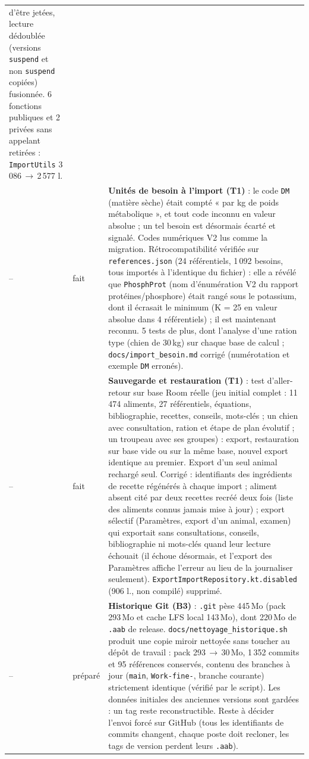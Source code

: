 \documentclass[11pt,a4paper]{article}
\newcommand{\code}[1]{\texttt{#1}}
\begin{document}
\begin{longtable}{p{0.5cm}p{3.2cm}p{11cm}}
           d'être jetées, lecture dédoublée (versions \code{suspend} et non \code{suspend} copiées)
           fusionnée. 6 fonctions publiques et 2 privées sans appelant retirées :
           \code{ImportUtils} 3\,086\,$\to$\,2\,577 l. \\
-- & fait & \textbf{Unités de besoin à l'import (T1)} : le code \code{DM} (matière sèche) était
           compté « par kg de poids métabolique », et tout code inconnu en valeur absolue ; un tel
           besoin est désormais écarté et signalé. Codes numériques V2 lus comme la migration.
           Rétrocompatibilité vérifiée sur \code{references.json} (24 référentiels, 1\,092 besoins,
           tous importés à l'identique du fichier) : elle a révélé que \code{PhosphProt} (nom
           d'énumération V2 du rapport protéines/phosphore) était rangé sous le potassium, dont il
           écrasait le minimum (K = 25 en valeur absolue dans 4 référentiels) ; il est
           maintenant reconnu. 5 tests de plus, dont l'analyse d'une ration type (chien de 30\,kg)
           sur chaque base de calcul ; \code{docs/import\_besoin.md} corrigé (numérotation et
           exemple \code{DM} erronés). \\
-- & fait & \textbf{Sauvegarde et restauration (T1)} : test d'aller-retour sur base Room réelle
           (jeu initial complet : 11\,474 aliments, 27 référentiels, équations, bibliographie,
           recettes, conseils, mots-clés ; un chien avec consultation, ration et étape de plan
           évolutif ; un troupeau avec ses groupes) : export, restauration sur base vide ou sur la
           même base, nouvel export identique au premier. Export d'un seul animal rechargé seul.
           Corrigé : identifiants des ingrédients de recette régénérés à chaque import ; aliment
           absent cité par deux recettes recréé deux fois (liste des aliments connus jamais mise à
           jour) ; export sélectif (Paramètres, export d'un animal, examen) qui exportait sans
           consultations, conseils, bibliographie ni mots-clés quand leur lecture échouait (il
           échoue désormais, et l'export des Paramètres affiche l'erreur au lieu de la journaliser
           seulement). \code{ExportImportRepository.kt.disabled} (906 l., non compilé) supprimé. \\
-- & préparé & \textbf{Historique Git (B3)} : \code{.git} pèse 445\,Mo (pack 293\,Mo et cache LFS
           local 143\,Mo), dont 220\,Mo de \code{.aab} de release. \code{docs/nettoyage\_historique.sh}
           produit une copie miroir nettoyée sans toucher au dépôt de travail : pack 293\,$\to$\,30\,Mo,
           1\,352 commits et 95 références conservés, contenu des branches à jour (\code{main},
           \code{Work-fine-}, branche courante) strictement identique (vérifié par le script). Les
           données initiales des anciennes versions sont gardées : un tag reste reconstructible.
           Reste à décider l'envoi forcé sur GitHub (tous les identifiants de commits changent,
           chaque poste doit recloner, les tags de version perdent leurs \code{.aab}). \\
\bottomrule
\end{longtable}
\end{document}
